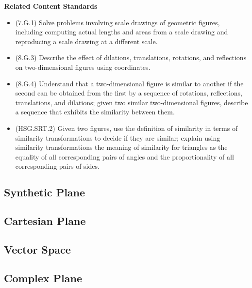 \documentclass[
]{book}
\providecommand{\tightlist}{%
  \setlength{\itemsep}{0pt}\setlength{\parskip}{0pt}}
\newenvironment{standards}{}{}
\theoremstyle{definition}
\theoremstyle{definition}
\theoremstyle{definition}
\theoremstyle{definition}
\theoremstyle{remark}
\begin{document}
\begin{standards}

\begin{center}
\textbf{Related Content Standards}

\end{center}

\begin{itemize}
\tightlist
\item
  (7.G.1) Solve problems involving scale drawings of geometric figures, including computing actual lengths and areas from a scale drawing and reproducing a scale drawing at a different scale.
\item
  (8.G.3) Describe the effect of dilations, translations, rotations, and reflections on two-dimensional figures using coordinates.
\item
  (8.G.4) Understand that a two-dimensional figure is similar to another if the second can be obtained from the first by a sequence of rotations, reflections, translations, and dilations; given two similar two-dimensional figures, describe a sequence that exhibits the similarity between them.
\item
  (HSG.SRT.2) Given two figures, use the definition of similarity in terms of similarity transformations to decide if they are similar; explain using similarity transformations the meaning of similarity for triangles as the equality of all corresponding pairs of angles and the proportionality of all corresponding pairs of sides.
\end{itemize}

\end{standards}

\hypertarget{synthetic-plane-5}{%
\subsection{Synthetic Plane}\label{synthetic-plane-5}}

\hypertarget{cartesian-plane-1}{%
\subsection{Cartesian Plane}\label{cartesian-plane-1}}

\hypertarget{vector-space-1}{%
\subsection{Vector Space}\label{vector-space-1}}

\hypertarget{complex-plane-5}{%
\subsection{Complex Plane}\label{complex-plane-5}}
\end{document}
